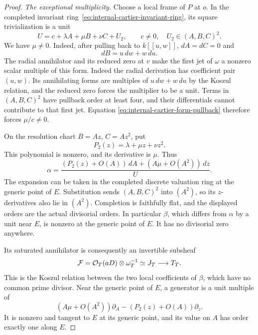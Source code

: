 \begin{proof}
\emph{The exceptional multiplicity.}
Choose a local frame of $P$ at $o$. In the completed invariant
ring~\eqref{eq:internal-cartier-invariant-ring}, its square
trivialization is a unit
\begin{equation}\label{eq:internal-cartier-unit-jet}
 U=c+\lambda A+\mu B+\nu C+U_2,
 \qquad c\ne0,\quad U_2\in(A,B,C)^2.
\end{equation}
We have $\mu\ne0$. Indeed, after pulling back to $k[[u,w]]$,
$dA=dC=0$ and
\[
 dB=u\,dw+w\,du.
\]
The radial annihilator and its reduced zero at $v$ make the
first jet of $\omega$ a nonzero scalar multiple of this form.
Indeed the radial derivation has coefficient pair $(u,w)$.
Its annihilating forms are multiples of $u\,dw+w\,du$ by the
Koszul relation, and the reduced zero forces the multiplier to
be a unit.
Terms in $(A,B,C)^2$ have pullback order at least four, and their
differentials cannot contribute to that first jet. Equation
\eqref{eq:internal-cartier-form-pullback} therefore forces
$\mu/c\ne0$.

On the resolution chart $B=Az$, $C=Az^2$, put
\[
 P_2(z)=\lambda+\mu z+\nu z^2.
\]
This polynomial is nonzero, and its derivative is $\mu$. Thus
\begin{equation}\label{eq:internal-cartier-exceptional-form}
 \alpha=
 \frac{(P_2(z)+O(A))\,dA+(A\mu+O(A^2))\,dz}{U}.
\end{equation}
The expansion can be taken in the completed discrete valuation
ring at the generic point of $E$. Substitution sends
$(A,B,C)^2$ into $(A^2)$, so its $z$-derivatives also lie in
$(A^2)$. Completion is faithfully flat, and the displayed orders
are the actual divisorial orders. In particular $\beta$, which
differs from $\alpha$ by a unit near $E$, is nonzero at the
generic point of $E$. It has no divisorial zero anywhere.

Its saturated annihilator is consequently an invertible subsheaf
\begin{equation}\label{eq:internal-cartier-annihilator}
 \mathcal F=\mathcal O_T(aD)\otimes\omega_T^{-1}
 \simeq J_T\longrightarrow T_T.
\end{equation}
This is the Koszul relation between the two local coefficients
of $\beta$, which have no common prime divisor. Near the generic
point of $E$, a generator is a unit multiple of
\begin{equation}\label{eq:internal-cartier-local-field}
 (A\mu+O(A^2))\partial_A
 -(P_2(z)+O(A))\partial_z.
\end{equation}
It is nonzero and tangent to $E$ at its generic point, and its
value on $A$ has order exactly one along $E$.


\end{proof}
